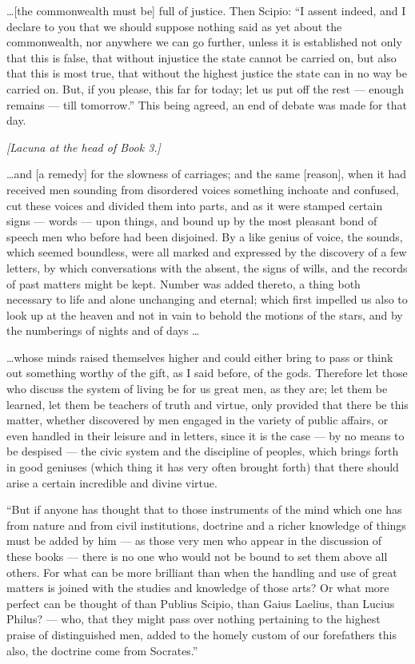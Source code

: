  \ldots [the commonwealth must be] full of justice. Then Scipio: ``I assent indeed, and I declare to you that we should suppose nothing said as yet about the commonwealth, nor anywhere we can go further, unless it is established not only that this is false, that without injustice the state cannot be carried on, but also that this is most true, that without the highest justice the state can in no way be carried on. But, if you please, this far for today; let us put off the rest --- enough remains --- till tomorrow.'' This being agreed, an end of debate was made for that day.


 \textit{[Lacuna at the head of Book 3.]}

 \ldots and [a remedy] for the slowness of carriages; and the same [reason], when it had received men sounding from disordered voices something inchoate and confused, cut these voices and divided them into parts, and as it were stamped certain signs --- words --- upon things, and bound up by the most pleasant bond of speech men who before had been disjoined. By a like genius of voice, the sounds, which seemed boundless, were all marked and expressed by the discovery of a few letters, by which conversations with the absent, the signs of wills, and the records of past matters might be kept. Number was added thereto, a thing both necessary to life and alone unchanging and eternal; which first impelled us also to look up at the heaven and not in vain to behold the motions of the stars, and by the numberings of nights and of days \ldots

 \ldots whose minds raised themselves higher and could either bring to pass or think out something worthy of the gift, as I said before, of the gods. Therefore let those who discuss the system of living be for us great men, as they are; let them be learned, let them be teachers of truth and virtue, only provided that there be this matter, whether discovered by men engaged in the variety of public affairs, or even handled in their leisure and in letters, since it is the case --- by no means to be despised --- the civic system and the discipline of peoples, which brings forth in good geniuses (which thing it has very often brought forth) that there should arise a certain incredible and divine virtue.

 ``But if anyone has thought that to those instruments of the mind which one has from nature and from civil institutions, doctrine and a richer knowledge of things must be added by him --- as those very men who appear in the discussion of these books --- there is no one who would not be bound to set them above all others. For what can be more brilliant than when the handling and use of great matters is joined with the studies and knowledge of those arts? Or what more perfect can be thought of than Publius Scipio, than Gaius Laelius, than Lucius Philus? --- who, that they might pass over nothing pertaining to the highest praise of distinguished men, added to the homely custom of our forefathers this also, the doctrine come from Socrates.''

